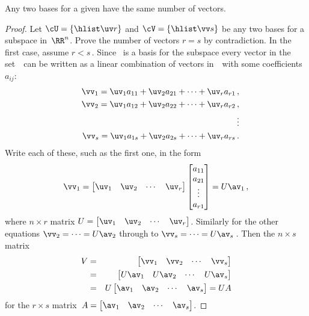 \begin{theorem} \label{thm:sameDii} 
Any two bases for a given  have the same number of vectors.
\end{theorem}
\begin{proof} 
Let \(\cU=\{\hlist\uv r\}\) and \(\cV=\{\hlist\vv s\}\) be any two  bases for a subspace in~\(\RR^n\).
Prove the number of vectors \(r=s\) by contradiction.
In the first case, assume \(r<s\)\,.
Since \cU\ is a basis for the subspace every vector in the set~\cV\ can be written as a linear combination of vectors in~\cU\ with some coefficients~\(a_{ij}\):
\begin{eqnarray*}
  &&\vv_1=\uv_1a_{11}+\uv_2a_{21}+\cdots+\uv_ra_{r1}\,,
\\&&\vv_2=\uv_1a_{12}+\uv_2a_{22}+\cdots+\uv_ra_{r2}\,,
\\&&\quad\vdots
\\&&\vv_s=\uv_1a_{1s}+\uv_2a_{2s}+\cdots+\uv_ra_{rs}\,.
\end{eqnarray*}
Write each of these, such as the first one, in the form
\begin{equation*}
\vv_1=\begin{bmatrix} \uv_1&\uv_2&\cdots&\uv_r \end{bmatrix}
\begin{bmatrix} a_{11}\\a_{21}\\\vdots\\a_{r1} \end{bmatrix}
=U\av_1\,,
\end{equation*}
where \(n\times r\) matrix \(U=\begin{bmatrix} \uv_1&\uv_2&\cdots&\uv_r \end{bmatrix}\).
Similarly for the other equations \(\vv_2=\cdots=U\av_2\) through to \(\vv_s=\cdots=U\av_s\)\,.
Then the \(n\times s\) matrix
\begin{eqnarray*}
V&=&\begin{bmatrix} \vv_1&\vv_2&\cdots&\vv_s \end{bmatrix}
\\&=&\begin{bmatrix} U\av_1& U\av_2&\cdots&U\av_s\end{bmatrix}
\\&=&U\begin{bmatrix} \av_1& \av_2&\cdots&\av_s\end{bmatrix}
=UA
\end{eqnarray*}
for the \(r\times s\) matrix~\(A=\begin{bmatrix} \av_1& \av_2&\cdots&\av_s \end{bmatrix}\).

\end{proof}
